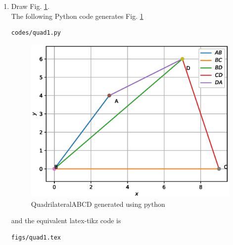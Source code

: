 \begin{enumerate}[label=\arabic*.,ref=\thesubsection.\theenumi]
\begin{table}[ht!]
\centering

\caption{Vertices A,B,C,D}
\label{table:table2}

\end{table}

\item Draw Fig. \ref{fig:quadri_py}.	
\\
\solution The  following Python code generates Fig. \ref{fig:quadri_py}
%
\begin{lstlisting}
codes/quad1.py
\end{lstlisting}
\begin{figure}[!ht]
\centering
\includegraphics[width=\columnwidth]{./figs/quad1.eps}
\caption{QuadrilateralABCD generated using python}
\label{fig:quadri_py}
\end{figure}
and the equivalent latex-tikz code is
%
\begin{lstlisting}
figs/quad1.tex
\end{lstlisting}
%

\end{enumerate}
